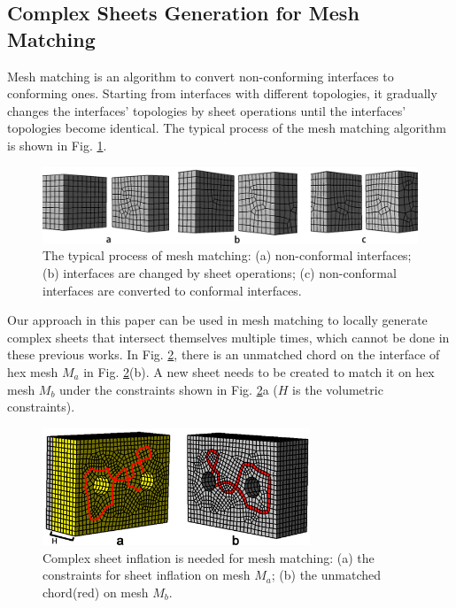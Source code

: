 \documentclass[final,5p,times,twocolumn]{elsarticle}
\begin{document}
\subsection{Complex Sheets Generation for Mesh Matching}
\label{sec:mesh_matching}
Mesh matching is an algorithm to convert non-conforming interfaces to conforming ones\cite{Chen:2015kf,Staten2010d}. Starting from interfaces with different topologies, it gradually changes the interfaces' topologies by sheet operations until the interfaces' topologies become identical. The typical process of the mesh matching algorithm is shown in Fig. \ref{fig:mesh_matching_exam}.

\begin{figure}[htbp]
\begin{center}
\includegraphics[width=16.5cm]{mesh_matching.png}
\caption{The typical process of mesh matching: (a) non-conformal interfaces; (b) interfaces are changed by sheet operations; (c) non-conformal interfaces are converted to conformal interfaces.}
\label{fig:mesh_matching_exam}
\end{center}
\end{figure}

Our approach in this paper can be used in mesh matching to locally generate complex sheets that intersect themselves multiple times, which cannot be done in these previous works. In Fig. \ref{fig:exam1_input}, there is an unmatched chord on the interface of hex mesh $M_a$ in Fig. \ref{fig:exam1_input}(b). A new sheet needs to be created to match it on hex mesh $M_b$ under the constraints shown in Fig. \ref{fig:exam1_input}a ($H$ is the volumetric constraints).

\begin{figure}[htbp]
\begin{center}
\includegraphics[width=8cm]{exam1_input.png}
\caption{Complex sheet inflation is needed for mesh matching: (a) the constraints for sheet inflation on mesh $M_a$; (b) the unmatched chord(red) on mesh $M_b$.}
\label{fig:exam1_input}
\end{center}
\end{figure}
\end{document}
